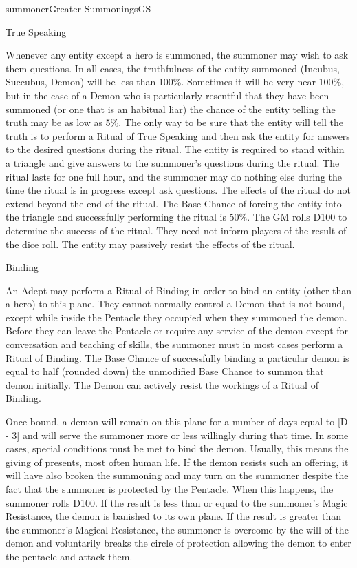 \begin{college}[1.0]{summoner}{Greater Summonings}{GS}
\begin{ritual}[Q-5]{True Speaking}
\begin{effects}
Whenever any entity except a hero is summoned, the summoner may wish
to ask them questions. In all cases, the truthfulness of the entity
summoned (Incubus, Succubus, Demon) will be less than 100\%.
Sometimes it will be very near 100\%, but in the case of a Demon who
is particularly resentful that they have been summoned (or one that is
an habitual liar) the chance of the entity telling the truth may be as
low as 5\%. The only way to be sure that the entity will tell the
truth is to perform a Ritual of True Speaking and then ask the entity
for answers to the desired questions during the ritual.  The entity is
required to stand within a triangle and give answers to the summoner's
questions during the ritual.  The ritual lasts for one full hour, and
the summoner may do nothing else during the time the ritual is in
progress except ask questions. The effects of the ritual do not extend
beyond the end of the ritual.  The Base Chance of forcing the entity
into the triangle and successfully performing the ritual is 50\%.  The
GM rolls D100 to determine the success of the ritual.  They need not
inform players of the result of the dice roll. The entity may
passively resist the effects of the ritual.
\end{effects}
\end{ritual}

\begin{ritual}[Q-6]{Binding}

\begin{effects}
An Adept may perform a Ritual of Binding in order to bind an entity
(other than a hero) to this plane.  They cannot normally control a
Demon that is not bound, except while inside the Pentacle they
occupied when they summoned the demon.  Before they can leave the
Pentacle or require any service of the demon except for conversation
and teaching of skills, the summoner must in most cases perform a
Ritual of Binding.  The Base Chance of successfully binding a
particular demon is equal to half (rounded down) the unmodified Base
Chance to summon that demon initially.  The Demon can actively resist
the workings of a Ritual of Binding.

Once bound, a demon will remain on this plane for a number of days
equal to [D - 3] and will serve the summoner more or less willingly
during that time.  In some cases, special conditions must be met to
bind the demon.  Usually, this means the giving of presents, most
often human life.  If the demon resists such an offering, it will have
also broken the summoning and may turn on the summoner despite the
fact that the summoner is protected by the Pentacle.  When this
happens, the summoner rolls D100. If the result is less than or equal
to the summoner's Magic Resistance, the demon is banished to its own
plane.  If the result is greater than the summoner's Magical
Resistance, the summoner is overcome by the will of the demon and
voluntarily breaks the circle of protection allowing the demon to
enter the pentacle and attack them.


\end{effects}
\end{ritual}
\end{college}
